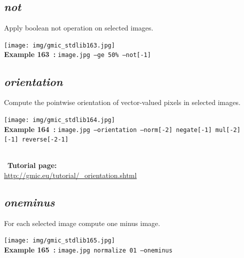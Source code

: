 \documentclass[a4paper,10.5pt,twoside]{book}
\def\comma{\discretionary{,}{}{,}}
\begin{document}
\subsection{\emph{not} }\vspace*{-0.7em}
Apply boolean not operation on selected images.
\begin{center}\texttt{[image: img/gmic\_stdlib163.jpg]}\\
{\footnotesize \textbf{Example 163~:} \texttt{image.jpg --ge 50\% --not[-1]}}
\end{center}

\subsection{\emph{orientation} }\vspace*{-0.7em}
Compute the pointwise orientation of vector-valued pixels in selected images.
\begin{center}\texttt{[image: img/gmic\_stdlib164.jpg]}\\
{\footnotesize \textbf{Example 164~:} \texttt{image.jpg --orientation --norm[-2] negate[-1] mul[-2] [-1] reverse[-2{\comma}-1]}}
\end{center}
~\\
~\textbf{Tutorial page: }\\\url{http://gmic.eu/tutorial/\_orientation.shtml}


\subsection{\emph{oneminus} }\vspace*{-0.7em}
For each selected image{\comma} compute one minus image.
\begin{center}\texttt{[image: img/gmic\_stdlib165.jpg]}\\
{\footnotesize \textbf{Example 165~:} \texttt{image.jpg normalize 0{\comma}1 --oneminus}}
\end{center}
\end{document}
